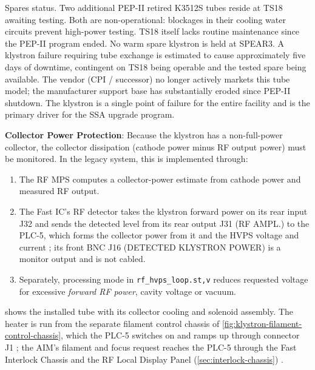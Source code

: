 Spares status. Two additional PEP-II retired K3512S tubes reside at TS18 awaiting testing. Both are non-operational: blockages in their cooling water circuits prevent high-power testing. TS18 itself lacks routine maintenance since the PEP-II program ended. No warm spare klystron is held at SPEAR3. A klystron failure requiring tube exchange is estimated to cause approximately five days of downtime, contingent on TS18 being operable and the tested spare being available. The vendor (CPI / successor) no longer actively markets this tube model; the manufacturer support base has substantially eroded since PEP-II shutdown. The klystron is a single point of failure for the entire facility and is the primary driver for the SSA upgrade program.


\textbf{Collector Power Protection}: Because the klystron has a non-full-power collector, the collector dissipation (cathode power minus RF output power) must be monitored. In the legacy system, this is implemented through:

\begin{enumerate}
\def\labelenumi{\arabic{enumi}.}
\tightlist
\item
  The RF MPS computes a collector-power estimate from cathode power and measured RF output.
\item
  The Fast IC's RF detector takes the klystron forward power on its rear input J32 and sends the detected level from its rear output J31 (RF AMPL.) to the PLC-5, which forms the collector power from it and the HVPS voltage and current ; its front BNC J16 (DETECTED KLYSTRON POWER) is a monitor output and is not cabled.
\item
  Separately, processing mode in \texttt{rf\_hvps\_loop.st,v} reduces requested voltage for excessive \emph{forward RF power}, cavity voltage or vacuum. 
\end{enumerate}

 shows the installed tube with its collector cooling and solenoid assembly. The heater is run from the separate filament control chassis of \cref{fig:klystron-filament-control-chassis}, which the PLC-5 switches on and ramps up through connector J1 ; the AIM's filament and focus request reaches the PLC-5 through the Fast Interlock Chassis and the RF Local Display Panel (\cref{sec:interlock-chassis}) .


